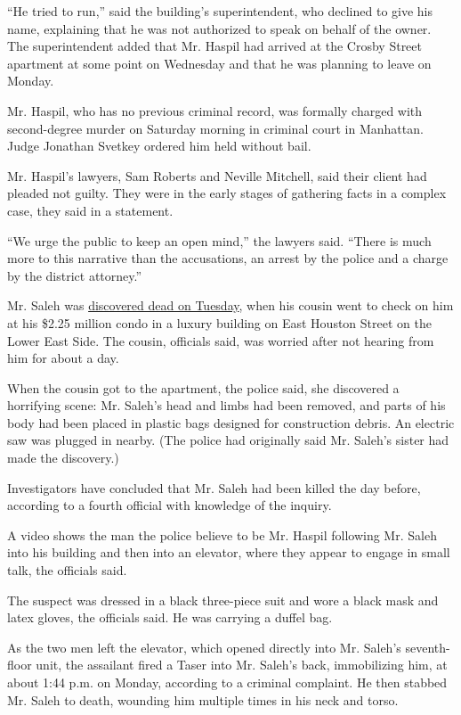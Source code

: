 ``He tried to run,'' said the building's superintendent, who declined to
give his name, explaining that he was not authorized to speak on behalf
of the owner. The superintendent added that Mr. Haspil had arrived at
the Crosby Street apartment at some point on Wednesday and that he was
planning to leave on Monday.

Mr. Haspil, who has no previous criminal record, was formally charged
with second-degree murder on Saturday morning in criminal court in
Manhattan. Judge Jonathan Svetkey ordered him held without bail.

Mr. Haspil's lawyers, Sam Roberts and Neville Mitchell, said their
client had pleaded not guilty. They were in the early stages of
gathering facts in a complex case, they said in a statement.

``We urge the public to keep an open mind,'' the lawyers said. ``There
is much more to this narrative than the accusations, an arrest by the
police and a charge by the district attorney.''

Mr. Saleh was
\href{https://www.nytimes.com/2020/07/15/nyregion/fahim-saleh-lower-east-side-murder.html?module=inline}{discovered
dead on Tuesday}, when his cousin went to check on him at his \$2.25
million condo in a luxury building on East Houston Street on the Lower
East Side. The cousin, officials said, was worried after not hearing
from him for about a day.

When the cousin got to the apartment, the police said, she discovered a
horrifying scene: Mr. Saleh's head and limbs had been removed, and parts
of his body had been placed in plastic bags designed for construction
debris. An electric saw was plugged in nearby. (The police had
originally said Mr. Saleh's sister had made the discovery.)

Investigators have concluded that Mr. Saleh had been killed the day
before, according to a fourth official with knowledge of the inquiry.

A video shows the man the police believe to be Mr. Haspil following Mr.
Saleh into his building and then into an elevator, where they appear to
engage in small talk, the officials said.

The suspect was dressed in a black three-piece suit and wore a black
mask and latex gloves, the officials said. He was carrying a duffel bag.

As the two men left the elevator, which opened directly into Mr. Saleh's
seventh-floor unit, the assailant fired a Taser into Mr. Saleh's back,
immobilizing him, at about 1:44 p.m. on Monday, according to a criminal
complaint. He then stabbed Mr. Saleh to death, wounding him multiple
times in his neck and torso.

